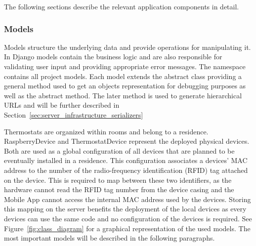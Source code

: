 The following sections describe the relevant application components in detail.

\subsubsection{Models}
\label{sec:server_infrastructure_models}

Models structure the underlying data and provide operations for manipulating it.
In Django models contain the business logic and are also responsible for validating user input and providing appropriate error messages.
The  namespace contains all project models.
Each model extends the abstract  class providing a general method used to get an objects representation for debugging purposes as well as the abstract  method.
The later method is used to generate hierarchical URLs and will be further described in Section~\ref{sec:server_infrastructure_serializers}

Thermostats are organized within rooms and belong to a residence.
RaspberryDevice and ThermostatDevice represent the deployed physical devices.
Both are used as a global configuration of all devices that are planned to be eventually installed in a residence.
This configuration associates a devices' MAC address to the number of the radio-frequency identification (RFID) tag attached on the device.
This is required to map between these two identifiers, as the hardware cannot read the RFID tag number from the device casing and the Mobile App cannot access the internal MAC address used by the devices.
Storing this mapping on the server benefits the deployment of the local devices as every devices can use the same code and no configuration of the devices is required.
See Figure~\ref{fig:class_diagram} for a graphical representation of the used models.
The most important models will be described in the following paragraphs.

